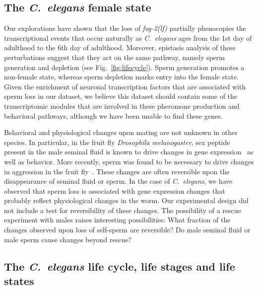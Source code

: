 \documentclass[9pt,twocolumn,twoside]{gsag3jnl}
\newcommand{\cel}{\emph{C.~elegans}}
\newcommand{\fog}{\emph{\mbox{fog-2(lf)}}}
\begin{document}
\subsection*{The \cel{} female state}
\label{sub:female_state}
Our explorations have shown that the loss of \fog{} partially phenocopies the
transcriptional events that occur naturally as \cel{} ages from the 1st day of
adulthood to the 6th day of adulthood. Moreover, epistasis analysis of these
perturbations suggest that they act on the same pathway, namely sperm generation
and depletion (see Fig.~\ref{fig:lifecycle}). Sperm generation promotes a non-female
state, whereas sperm depletion marks entry into the female state. Given the
enrichment of neuronal transcription factors that are associated with sperm loss
in our dataset, we believe this dataset should contain some of the transcriptomic
modules that are involved in these pheromone production and behavioral pathways,
although we have been unable to find these genes.

Behavioral and physiological changes upon mating are not unknown in other species.
In particular, in the fruit fly \emph{Drosophila melanogaster}, sex peptide
present in the male seminal fluid is known to drive changes in gene
expression~\citep{Liu2003,Xue2000,Avila2011} as well as behavior. More recently,
sperm was found to be necessary to drive changes in aggression in the fruit
fly~\citep{Bath2017}. These changes are often reversible upon the disappearance
of seminal fluid or sperm. In the case of \cel{}, we have observed that sperm
loss is associated with gene expression changes that probably reflect
physiological changes in the worm. Our experimental design did not include a test
for reversibility of these changes. The possibility of a rescue experiment with
males raises interesting possibilities: What fraction of the changes observed
upon loss of self-sperm are reversible? Do male seminal fluid or male sperm cause
changes beyond rescue?

\subsection*{The \cel{} life cycle, life stages and life states}
\end{document}
